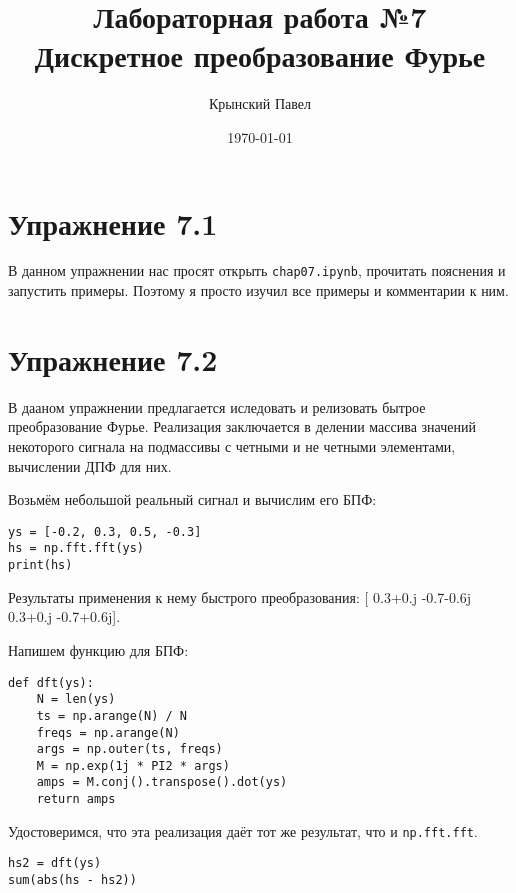 \documentclass[a4paper,12pt]{report}
\title{Лабораторная работа №7\\Дискретное преобразование Фурье}
\author{Крынский Павел}
\date{\today}
\begin{document}
\maketitle
\tableofcontents
\lstlistoflistings

\maketitle

\chapter{Упражнение 7.1}

В данном упражнении нас просят открыть \texttt{chap07.ipynb}, прочитать пояснения и запустить примеры. Поэтому я просто изучил все примеры и комментарии к ним.


\chapter{Упражнение 7.2}

В дааном упражнении предлагается иследовать и релизовать бытрое преобразование Фурье. Реализация заключается в делении массива значений некоторого сигнала на подмассивы с четными и не четными элементами, вычислении ДПФ для них.

Возьмём небольшой реальный сигнал и вычислим его БПФ:

\begin{lstlisting}[caption=Вычисление БПФ при помощи \texttt{np.fft.fft}]
ys = [-0.2, 0.3, 0.5, -0.3]
hs = np.fft.fft(ys)
print(hs)
\end{lstlisting}

Результаты применения к нему быстрого преобразования: [ 0.3+0.j  -0.7-0.6j  0.3+0.j  -0.7+0.6j].

Напишем функцию для БПФ:

\begin{lstlisting}[caption=Функция \texttt{dft}]
def dft(ys):
    N = len(ys)
    ts = np.arange(N) / N
    freqs = np.arange(N)
    args = np.outer(ts, freqs)
    M = np.exp(1j * PI2 * args)
    amps = M.conj().transpose().dot(ys)
    return amps
\end{lstlisting}

Удостоверимся, что эта реализация даёт тот же результат, что и \texttt{np.fft.fft}.

\begin{lstlisting}[caption=Сравнение реализаций]
hs2 = dft(ys)
sum(abs(hs - hs2))
\end{lstlisting}
\end{document}
